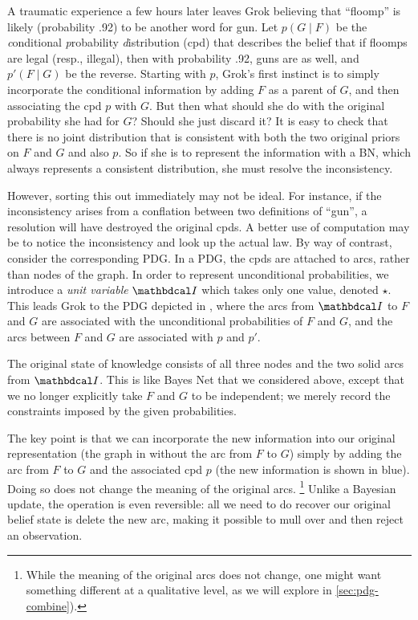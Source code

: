 \begin{example}
A traumatic experience a few hours later leaves Grok believing that
``floomp'' is likely (probability .92) to be another word for gun.
Let $p(G \mid F)$ be the \emph conditional \emph probability \emph
distribution (cpd) that describes 
the belief that if floomps are legal (resp., illegal),
then with probability .92, guns are as well, and $p'(F \mid G)$ be
the reverse. 
Starting with $p$, Grok's first instinct is to
simply incorporate the conditional information by adding $F$ as a parent of
$G$, and then associating
the cpd
$p$ with $G$. But then what should she do
with the original probability she had for $G$?  Should she just discard it?
It is easy to check that there is no 
joint distribution
that is consistent with
both
the two original priors on $F$ and $G$ and also 
$p$.  So if she
is to represent the information with a BN, which always represents a consistent
distribution, she must resolve the inconsistency. 





However, sorting this out immediately may not be ideal. For instance, if the inconsistency arises from a conflation between two definitions of ``gun'', a resolution will have destroyed the original cpds. A better use of computation may be to notice the inconsistency and look up the actual law. 
%
By way of contrast, consider the corresponding PDG. In a PDG, the cpds are
attached to arcs, rather than nodes of the graph.
In order to represent unconditional probabilities, we introduce
a \emph{unit variable} $\pdgunit$ which 
takes only one value, denoted
$\star$. 
This leads Grok to 
the PDG depicted in ,
where the arcs from $\pdgunit$ to $F$ and $G$ are associated with the
unconditional probabilities of $F$ and $G$, and the 
arcs between $F$ and $G$ are associated with $p$ and $p'$.



The original state of knowledge consists of all three nodes and the two solid arcs from $\pdgunit$. This is like Bayes Net that we considered above, except that we no longer explicitly take  $F$ and $G$ to be independent; we merely record the constraints imposed by the given probabilities.  
	
The key point is that we can incorporate the new information into our original
representation (the graph in  without the arc from
$F$ to $G$) simply  by adding the arc from $F$ to $G$ and the associated cpd
$p$ (the new information is shown in blue).
Doing so does not change the meaning of the original arcs.
\unskip\footnote{%
    While the meaning of the original arcs does not change, one might want something different at a qualitative level, as we will explore in \cref{sec:pdg-combine}).
}
Unlike a Bayesian update, the operation is even reversible: all we need
to do recover our original belief state is delete the new arc, 
making it possible to mull over and then reject an observation.
\end{example}


